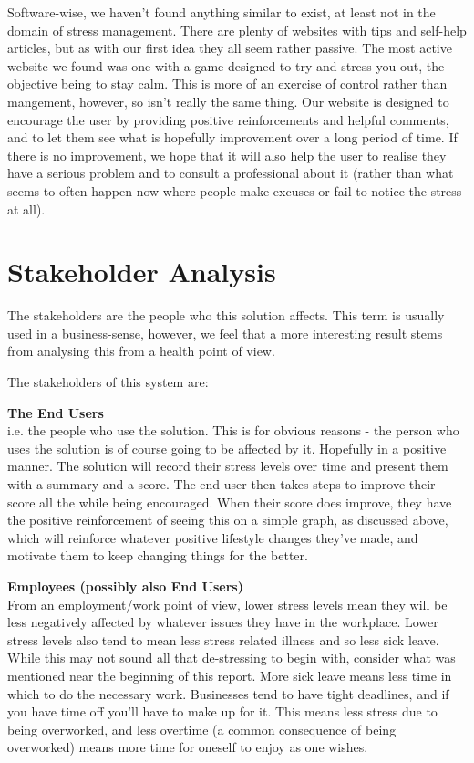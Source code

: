 \documentclass{scrartcl}
\begin{document}
Software-wise, we haven't found anything similar to exist, at least not in the domain of stress management. There are plenty of
websites with tips and self-help articles, but as with our first idea they all seem rather passive. The most active website we
found was one with a game designed to try and stress you out, the objective being to stay calm. This is more of an exercise of
control rather than mangement, however, so isn't really the same thing. Our website is designed to encourage the user by 
providing positive reinforcements and helpful comments, and to let them see what is hopefully improvement over a long period of time.
If there is no improvement, we hope that it will also help the user to realise they have a serious problem and to consult a
professional about it (rather than what seems to often happen now where people make excuses or fail to notice the stress at all).

\section{Stakeholder Analysis}
The stakeholders are the people who this solution affects. This term is usually used in a business-sense, however, we feel that
a more interesting result stems from analysing this from a health point of view.

The stakeholders of this system are:

\textbf{The End Users}\\
i.e. the people who use the solution. This is for obvious reasons - the person who uses the solution is of course going to be
affected by it. Hopefully in a positive manner. The solution will record their stress levels over time and present them with
a summary and a score. The end-user then takes steps to improve their score all the while being encouraged. When their score
does improve, they have the positive reinforcement of seeing this on a simple graph, as discussed above, which will reinforce
whatever positive lifestyle changes they've made, and motivate them to keep changing things for the better.

\textbf{Employees (possibly also End Users)}\\
From an employment/work point of view, lower stress levels mean they will be less negatively affected by whatever issues they
have in the workplace. Lower stress levels also tend to mean less stress related illness and so less sick leave. While this may
not sound all that de-stressing to begin with, consider what was mentioned near the beginning of this report. More sick leave
means less time in which to do the necessary work. Businesses tend to have tight deadlines, and if you have time off you'll have
to make up for it. This means less stress due to being overworked, and less overtime (a common consequence of being overworked)
means more time for oneself to enjoy as one wishes.
\end{document}
